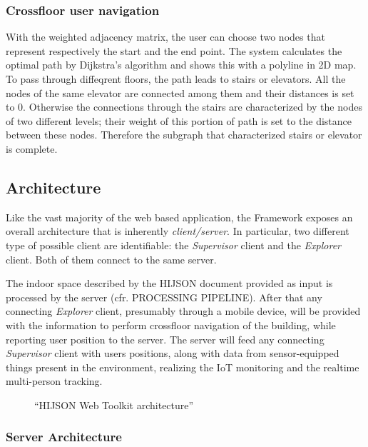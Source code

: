 \documentclass{sig-alternate}
\begin{document}
\subsubsection{Crossfloor user navigation}\label{crossfloor-user-navigation}

With the weighted adjacency matrix, the user can choose two nodes that
represent respectively the start and the end point. The system
calculates the optimal path by Dijkstra's algorithm and shows this with
a polyline in 2D map. To pass through diffeqrent floors, the path leads
to stairs or elevators. All the nodes of the same elevator are connected
among them and their distances is set to 0. Otherwise the connections
through the stairs are characterized by the nodes of two different
levels; their weight of this portion of path is set to the distance
between these nodes. Therefore the subgraph that characterized stairs or
elevator is complete.

\subsection{Architecture}\label{architecture}

Like the vast majority of the web based application, the Framework
exposes an overall architecture that is inherently \emph{client/server}.
In particular, two different type of possible client are identifiable:
the \emph{Supervisor} client and the \emph{Explorer} client. Both of
them connect to the same server.

The indoor space described by the HIJSON document provided as input is
processed by the server (cfr. PROCESSING PIPELINE). After that any
connecting \emph{Explorer} client, presumably through a mobile device,
will be provided with the information to perform crossfloor navigation
of the building, while reporting user position to the server. The server
will feed any connecting \emph{Supervisor} client with users positions,
along with data from sensor-equipped things present in the environment,
realizing the IoT monitoring and the realtime multi-person tracking.

\begin{figure}[!htbp]
\centering
{}
\caption{``HIJSON Web Toolkit architecture''}
\label{fig:pipeline}
\end{figure}

\subsubsection{Server Architecture}\label{server-architecture}
\end{document}
